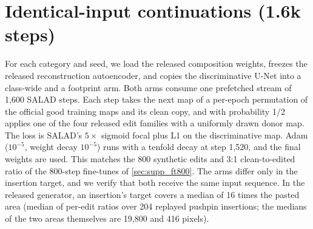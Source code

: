 \begin{table}[t]
\centering
\caption{Training controls and inspection thresholds. Compartment AUROC is measured on matched training faults. $t_s$ is the scene threshold. $t_{95}$ and $t_{98}$ use 95\% and 98\% target recall, and $t_{\rm budget}$ uses 0.5 untouched compartments. Numbers are rounded for display. All decisions use full-precision thresholds.}
\label{tab:thresholds_v3}
\scriptsize
\setlength{\tabcolsep}{3.5pt}

\end{table}

\begin{table}[t]
\centering
\caption{Stability on two fixed photo halves. Difference in untouched compartments per fault, footprint minus class-wide. The 63 and 75 originals were assigned before fitting. The recipe with relocation training is the primary test. The upstream-only continuation reuses the same originals.}
\label{tab:halves_v3}
\scriptsize

\end{table}

\begin{table}[p]
\centering
\caption{Collateral change after rule-aware adaptation. Compartments and pixels report percentages with absolute change $\geq0.5$. Max and quantiles are mean within-compartment statistics in sigmoid units. We use the same 13 untouched fault compartments for each variant.}
\label{tab:changes_v3}
\scriptsize
\setlength{\tabcolsep}{4pt}

\end{table}

\begin{table}[p]
\centering
\caption{Collateral change after upstream-only continuation. The region definition matches \cref{tab:changes_v3}.}
\label{tab:changes_upstream}
\scriptsize
\setlength{\tabcolsep}{4pt}

\end{table}
\section{Identical-input continuations (1.6k steps)}
\label{sec:supp_cont}
\label{sec:supp_ft}
For each category and seed, we load the released composition weights, freezes the released reconstruction autoencoder, and copies the discriminative U-Net into a class-wide and a footprint arm. Both arms consume one prefetched stream of 1{,}600 SALAD steps. Each step takes the next map of a per-epoch permutation of the official good training maps and its clean copy, and with probability 1/2 applies one of the four released edit families with a uniformly drawn donor map. The loss is SALAD's $5\times$ sigmoid focal plus L1 on the discriminative map. Adam ($10^{-5}$, weight decay $10^{-5}$) runs with a tenfold decay at step 1{,}520, and the final weights are used. This matches the 800 synthetic edits and 3:1 clean-to-edited ratio of the 800-step fine-tunes of \cref{sec:supp_ft800}. The arms differ only in the insertion target, and we verify that both receive the same input sequence. In the released generator, an insertion's target covers a median of 16 times the pasted area (median of per-edit ratios over 204 replayed pushpin insertions; the medians of the two areas themselves are 19{,}800 and 416 pixels).
